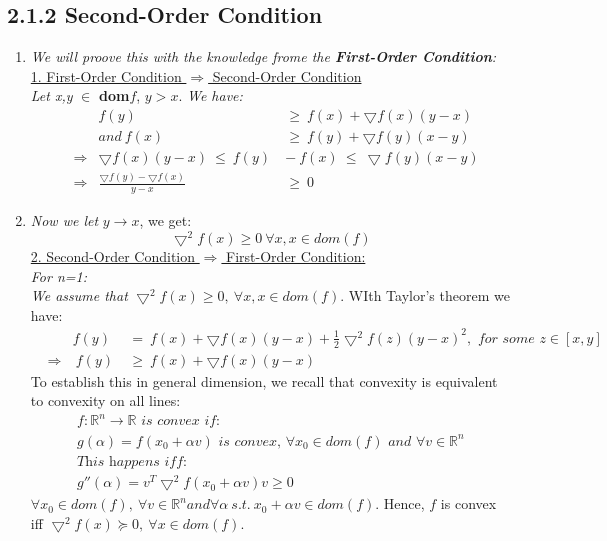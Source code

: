 \documentclass{report}
\begin{document}
	\subsection*{2.1.2 Second-Order Condition}
		\begin{enumerate}[]
			\item \textit{We will proove this with the knowledge frome the \textbf{First-Order Condition}:} \\
			\underline{1. First-Order Condition $\Rightarrow$ Second-Order Condition} \\
			\textit{Let x,y} $\in$ \textbf{dom}$f$, $y>x$. \textit{We have:}
			\begin{align*}
				& & f(y) \ & \geq \ f(x) + \bigtriangledown f(x)(y-x) \\
				& & and \ f(x) \ & \geq \ f(y) + \bigtriangledown f(y)(x-y) \\
				& \Rightarrow & \bigtriangledown f(x)(y-x) \ \leq \ f(y) \ & - \ f(x) \ \leq \ \bigtriangledown f(y)(x-y) \\
				& \Rightarrow & \frac{\bigtriangledown f(y) - \bigtriangledown f(x)}{y-x} \ & \geq \ 0
			\end{align*}
			\item \textit{Now we let } $y \rightarrow x$, we get:
		\[
			\bigtriangledown^2 f(x) \geq 0 \ \forall x, x \in dom(f)
		\]
			\underline{2. Second-Order Condition $\Rightarrow$ First-Order Condition:} \\
			\textit{For n=1:} \\
			\textit{We assume that} $\bigtriangledown^2 f(x) \geq 0, \ \forall x, x \in dom(f)$. WIth Taylor's theorem we have:
			\begin{align*}
				& & f(y) \ & = \ f(x) + \bigtriangledown f(x)(y-x) + \frac{1}{2} \bigtriangledown^2 f(z)(y-x)^2, \textit{ for some } z \in [x,y] \\
				& \Rightarrow & \ f(y) \ & \geq \ f(x) + \bigtriangledown f(x)(y-x)
			\end{align*}
			To establish this in general dimension, we recall that convexity  is equivalent to convexity on all lines:
			\begin{align*}
				f: \mathbb{R}^n \rightarrow \mathbb{R} \textit{ is convex if: } \\
				g(\alpha ) = f(x_0 + \alpha v) \textit{ is convex, } \forall x_0 \in dom(f) \textit{ and } \forall v \in \mathbb{R}^n \\
				\textit{This happens iff: } \\
				g''(\alpha ) = v^T \bigtriangledown ^2 f(x_0 + \alpha v)v \geq 0
			\end{align*}
			$\forall x_0 \in dom(f), \ \forall v \in \mathbb{R}^n and \forall \alpha \ s.t. \ x_0 + \alpha v \in dom(f).$ Hence, $f$ is convex iff $\bigtriangledown ^2 f(x) \succeq 0, \ \forall x \in dom(f).$
		\end{enumerate}	
	\newpage
\end{document}
